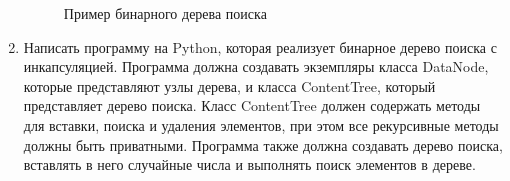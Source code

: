 \begin{enumerate}
\begin{figure}[h]
\centering
{}
\caption{Пример бинарного дерева поиска}
\end{figure}

\item Написать программу на Python, которая реализует бинарное дерево поиска с инкапсуляцией. Программа должна создавать экземпляры класса DataNode, которые представляют узлы дерева, и класса ContentTree, который представляет дерево поиска. Класс ContentTree должен содержать методы для вставки, поиска и удаления элементов, при этом все рекурсивные методы должны быть приватными. Программа также должна создавать дерево поиска, вставлять в него случайные числа и выполнять поиск элементов в дереве.


\end{enumerate}
